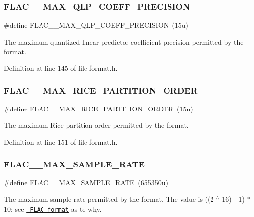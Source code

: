 \subsubsection{\texorpdfstring{FLAC\_\_MAX\_QLP\_COEFF\_PRECISION}{FLAC\_\_MAX\_QLP\_COEFF\_PRECISION}}
{\footnotesize\ttfamily \#define F\+L\+A\+C\+\_\+\+\_\+\+M\+A\+X\+\_\+\+Q\+L\+P\+\_\+\+C\+O\+E\+F\+F\+\_\+\+P\+R\+E\+C\+I\+S\+I\+ON~(15u)}

The maximum quantized linear predictor coefficient precision permitted by the format. 

Definition at line 145 of file format.\+h.

\mbox{\label{group__flac__format_ga78a2e97e230b2aa7f99edc94a466f5bb}} 
\subsubsection{\texorpdfstring{FLAC\_\_MAX\_RICE\_PARTITION\_ORDER}{FLAC\_\_MAX\_RICE\_PARTITION\_ORDER}}
{\footnotesize\ttfamily \#define F\+L\+A\+C\+\_\+\+\_\+\+M\+A\+X\+\_\+\+R\+I\+C\+E\+\_\+\+P\+A\+R\+T\+I\+T\+I\+O\+N\+\_\+\+O\+R\+D\+ER~(15u)}

The maximum Rice partition order permitted by the format. 

Definition at line 151 of file format.\+h.

\mbox{\label{group__flac__format_ga99abeef0c05c6bc76eacfa865abbfa70}} 
\subsubsection{\texorpdfstring{FLAC\_\_MAX\_SAMPLE\_RATE}{FLAC\_\_MAX\_SAMPLE\_RATE}}
{\footnotesize\ttfamily \#define F\+L\+A\+C\+\_\+\+\_\+\+M\+A\+X\+\_\+\+S\+A\+M\+P\+L\+E\+\_\+\+R\+A\+TE~(655350u)}

The maximum sample rate permitted by the format. The value is ((2 $^\wedge$ 16) -\/ 1) $\ast$ 10; see \href{../format.html}{\texttt{ F\+L\+AC format}} as to why. 

